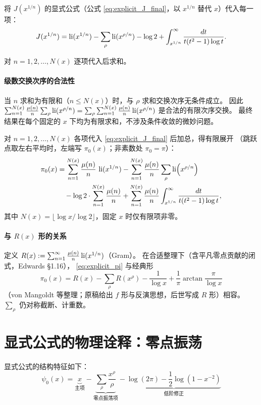 将 $J(x^{1/n})$ 的显式公式（公式 \eqref{eq:explicit_J_final}，以 $x^{1/n}$ 替代 $x$）代入每一项：
\[
J(x^{1/n}) = \operatorname{li}(x^{1/n}) - \sum_\rho \operatorname{li}(x^{\rho/n}) - \log 2
              + \int_{x^{1/n}}^\infty \frac{dt}{t(t^2-1)\log t}.
\]

对 $n=1,2,\ldots,N(x)$ 逐项代入后求和。


\paragraph{级数交换次序的合法性}
当 $n$ 求和为有限和（$n \le N(x)$）时，与 $\rho$ 求和交换次序无条件成立。
因此 $\sum_{n=1}^{N(x)}\frac{\mu(n)}{n}\sum_\rho \operatorname{li}(x^{\rho/n})
= \sum_\rho \sum_{n=1}^{N(x)}\frac{\mu(n)}{n}\operatorname{li}(x^{\rho/n})$ 是合法的有限次序交换。
最终结果在每个固定的 $x$ 下均为有限求和，不涉及条件收敛的微妙问题。


对 $n=1,2,\ldots,N(x)$ 各项代入 \eqref{eq:explicit_J_final} 后加总，得有限展开
（跳跃点取左右平均时，左端写 $\pi_0(x)$；非素数处 $\pi_0=\pi$）：
\begin{equation}
\begin{aligned}
\pi_0(x) &= \sum_{n=1}^{N(x)}\frac{\mu(n)}{n}\,\operatorname{li}(x^{1/n})
         - \sum_{n=1}^{N(x)}\frac{\mu(n)}{n}\sum_{\rho}\operatorname{li}\!\left(x^{\rho/n}\right)\\
       &\quad{} - \log 2\cdot\sum_{n=1}^{N(x)}\frac{\mu(n)}{n}
         + \sum_{n=1}^{N(x)}\frac{\mu(n)}{n}\int_{x^{1/n}}^{\infty}\frac{dt}{t(t^2-1)\log t},
\end{aligned}
\label{eq:explicit_pi}
\end{equation}
其中 $N(x)=\lfloor\log x/\log 2\rfloor$，固定 $x$ 时仅有限项非零。

\paragraph{与 $R(x)$ 形的关系}
定义 $R(x):=\sum_{n=1}^{\infty}\frac{\mu(n)}{n}\operatorname{li}(x^{1/n})$（Gram）。
在合适整理下（含平凡零点贡献的闭式，Edwards §1.16），
\eqref{eq:explicit_pi} 与经典形
\[
\pi_0(x)=R(x)-\sum_{\rho}R(x^{\rho})-\frac{1}{\log x}+\frac{1}{\pi}\arctan\frac{\pi}{\log x}
\]
（von Mangoldt 等整理；原稿给出 $f$ 形与反演思想，后世写成 $R$ 形）相容。
$\sum_\rho$ 仍对称截断、计重数。


\section{显式公式的物理诠释：零点振荡}\label{sec:physical-interpretation}

显式公式的结构特征如下：
\[
\psi_0(x) = \underbrace{x}_{\text{主项}} - \underbrace{\sum_{\rho}\frac{x^{\rho}}{\rho}}_{\text{零点振荡项}} - \underbrace{\log(2\pi) - \frac12\log(1-x^{-2})}_{\text{低阶修正}}
\]

